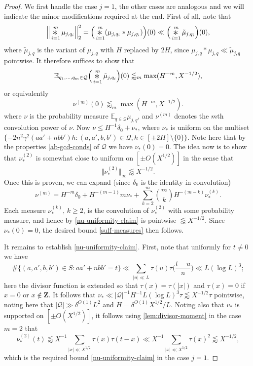 \documentclass[11pt,reqno]{amsart}
\numberwithin{equation}{section}
\theoremstyle{definition}
\theoremstyle{remark}
\newcommand{\mb}{\mathbb}
\newcommand{\mc}{\mathcal}
\renewcommand{\le}{\leqslant}
\renewcommand{\ge}{\geqslant}
\newcommand\Z{\mathbf{Z}}
\newcommand\E{\mb{E}}
\newcommand{\conv}{\mathop{\scalebox{1.5}{\raisebox{-0.2ex}{$\ast$}}}}
\begin{document}
\begin{proof}
We first handle the case $j = 1$, the other cases are analogous and we will indicate the minor modifications required at the end. First of all, note that 
\[  \Big\Vert \conv_{i=1}^{m} \mu_{j, q_i} \Big\Vert^2_{2} =  \Big( \conv_{i=1}^{m} ( \mu_{j,q_i} \ast \mu_{j,q_i} ) \Big)(0) \ll  \Big( \conv_{i=1}^{m} \tilde\mu_{j,q_i}\Big)(0) ,\] where $\tilde\mu_{j,q}$ is the variant of $\mu_{j,q}$ with $H$ replaced by $2H$, since $\mu_{j,q} \ast \mu_{j,q} \ll \tilde \mu_{j,q}$ pointwise.  It therefore suffices to show that 
\[
\E_{q_1,\dots, q_{m} \in \mc{Q}} \Big(\conv_{i=1}^{m} \tilde\mu_{j,q_i}\Big)(0) \lessapprox_{m} \max(H^{-m},  X^{-1/2}),
\]
or equivalently
\begin{equation}\label{suff-measures}
\nu^{(m)}(0) \lessapprox_{m} \max(H^{-m},  X^{-1/2}).
\end{equation}
where $\nu$ is the probability measure $\E_{q \in \mc{Q}} \mu_{j,q}$, and $\nu^{(m)}$ denotes the $m$th convolution power of $\nu$. Now $\nu \le H^{-1}\delta_0 + \nu_*$, where $\nu_*$ is uniform on the multiset $\{-2n^2\gamma^2 (aa' + n bb') h : (a,a', b, b') \in \mc{Q}, h \in [\pm 2H] \setminus \{0\}\}$. Note here that by the properties \cref{ab-gcd-conds} of $\mc{Q}$ we have $\nu_*(0) = 0$. The idea now is to show that $\nu^{(2)}_*$ is somewhat close to uniform on $[\pm O(X^{1/2})]$ in the sense that 
\begin{equation}\label{nu-uniformity-claim} \Vert \nu^{(2)}_* \Vert_{\infty} \lessapprox X^{-1/2}.\end{equation} Once this is proven, we can expand (since $\delta_0$ is the identity in convolution)
\[ \nu^{(m)} = H^{-m} \delta_0 + H^{-(m - 1)} m  \nu_* + \sum_{k=2}^{m}\binom{m}{k} H^{-(m - k)}  \nu_*^{(k)}.\]
Each measure $\nu_*^{(k)}$, $k \ge 2$, is the convolution of $\nu_*^{(2)}$ with some probability measure, and hence by \cref{nu-uniformity-claim} is pointwise $\lessapprox X^{-1/2}$. Since $\nu_*(0) = 0$, the desired bound \cref{suff-measures} then follows.

It remains to establish \cref{nu-uniformity-claim}. First, note that uniformly for $t \neq 0$ we have
\begin{equation}\label{aabb-div}
\#\{(a, a', b, b') \in S : aa' + nbb' = t\} \ll \sum_{|u|\ll L}\tau(u)\tau\bigg(\frac{t - u}{n}\bigg)\ll L(\log L)^{3};
\end{equation}
here the divisor function is extended so that $\tau(x) = \tau(|x|)$ and $\tau(x) = 0$ if $x=0$ or $x\notin \Z$. It follows that $\nu_* \ll |\mc{Q}|^{-1}H^{-1} L(\log L)^3 \tau \lessapprox X^{-1/2} \tau$ pointwise, noting here that $|\mc{Q}| \gg \delta^{O(1)} L^2$ and $H = \delta^{O(1)} X^{1/2}/L$. Noting also that $v_*$ is supported on $[\pm O(X^{1/2})]$, it follows using \cref{lem:divisor-moment} in the case $m = 2$ that 
\[ \nu_*^{(2)}(t) \lessapprox X^{-1} \sum_{|x| \ll X^{1/2}} \tau(x) \tau( t - x) \ll X^{-1} \sum_{|x| \ll X^{1/2}} \tau(x)^2 \lessapprox X^{-1/2},  \] which is the required bound \cref{nu-uniformity-claim} in the case $j = 1$.


\end{proof}
\end{document}
